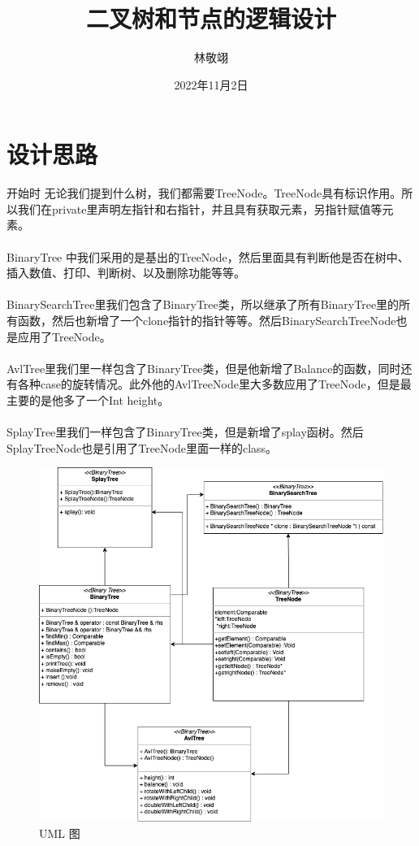 \documentclass{article}
\title{二叉树和节点的逻辑设计}
\author{林敬翊}
\date{2022年11月2日}
\begin{document}
\maketitle

\section{设计思路}
    开始时 无论我们提到什么树，我们都需要TreeNode。TreeNode具有标识作用。所以我们在private里声明左指针和右指针，并且具有获取元素，另指针赋值等元素。
    \\
    \\
    BinaryTree 中我们采用的是基出的TreeNode，然后里面具有判断他是否在树中、插入数值、打印、判断树、以及删除功能等等。
    \\
    \\
    BinarySearchTree里我们包含了BinaryTree类，所以继承了所有BinaryTree里的所有函数，然后也新增了一个clone指针的指针等等。然后BinarySearchTreeNode也是应用了TreeNode。
    \\
    \\
    AvlTree里我们里一样包含了BinaryTree类，但是他新增了Balance的函数，同时还有各种case的旋转情况。此外他的AvlTreeNode里大多数应用了TreeNode，但是最主要的是他多了一个Int height。
    \\
    \\
    SplayTree里我们一样包含了BinaryTree类，但是新增了splay函树。然后SplayTreeNode也是引用了TreeNode里面一样的class。

\begin{figure}[H]
    \centering
    \includegraphics[scale=0.25]{BinaryTree.png}
    \caption{UML 图}
    \label{fig:1}
\end{figure}
    
    
\end{document}
